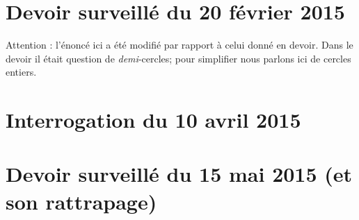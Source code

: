\section{Devoir surveillé du 20 février 2015}


Attention : l'énoncé ici a été modifié par rapport à celui donné en devoir. Dans le devoir il était question de \emph{demi}-cercles; pour simplifier nous parlons ici de cercles entiers.


\section{Interrogation du 10 avril 2015}


\section{Devoir surveillé du 15 mai 2015 (et son rattrapage)}

